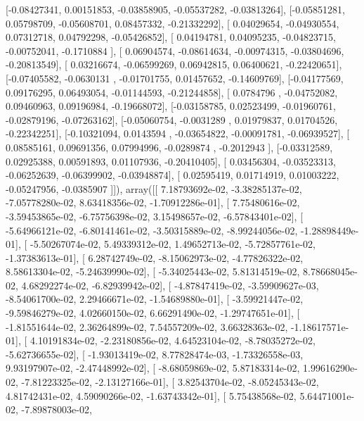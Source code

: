 \documentclass{article}
\begin{document}
       [-0.08427341,  0.00151853, -0.03858905, -0.05537282, -0.03813264],
       [-0.05851281,  0.05798709, -0.05608701,  0.08457332, -0.21332292],
       [ 0.04029654, -0.04930554,  0.07312718,  0.04792298, -0.05426852],
       [ 0.04194781,  0.04095235, -0.04823715, -0.00752041, -0.1710884 ],
       [ 0.06904574, -0.08614634, -0.00974315, -0.03804696, -0.20813549],
       [ 0.03216674, -0.06599269,  0.06942815,  0.06400621, -0.22420651],
       [-0.07405582, -0.0630131 , -0.01701755,  0.01457652, -0.14609769],
       [-0.04177569,  0.09176295,  0.06493054, -0.01144593, -0.21244858],
       [ 0.0784796 , -0.04752082,  0.09460963,  0.09196984, -0.19668072],
       [-0.03158785,  0.02523499, -0.01960761, -0.02879196, -0.07263162],
       [-0.05060754, -0.0031289 ,  0.01979837,  0.01704526, -0.22342251],
       [-0.10321094,  0.0143594 , -0.03654822, -0.00091781, -0.06939527],
       [ 0.08585161,  0.09691356,  0.07994996, -0.0289874 , -0.2012943 ],
       [-0.03312589,  0.02925388,  0.00591893,  0.01107936, -0.20410405],
       [ 0.03456304, -0.03523313, -0.06252639, -0.06399902, -0.03948874],
       [ 0.02595419,  0.01714919,  0.01003222, -0.05247956, -0.0385907 ]]), array([[  7.18793692e-02,  -3.38285137e-02,  -7.05778280e-02,
          8.63418356e-02,  -1.70912286e-01],
       [  7.75480616e-02,  -3.59453865e-02,  -6.75756398e-02,
          3.15498657e-02,  -6.57843401e-02],
       [ -5.64966121e-02,  -6.80141461e-02,  -3.50315889e-02,
         -8.99244056e-02,  -1.28898449e-01],
       [ -5.50267074e-02,   5.49339312e-02,   1.49652713e-02,
         -5.72857761e-02,  -1.37383613e-01],
       [  6.28742749e-02,  -8.15062973e-02,  -4.77826322e-02,
          8.58613304e-02,  -5.24639990e-02],
       [ -5.34025443e-02,   5.81314519e-02,   8.78668045e-02,
          4.68292274e-02,  -6.82939942e-02],
       [ -4.87847419e-02,  -3.59909627e-03,  -8.54061700e-02,
          2.29466671e-02,  -1.54689880e-01],
       [ -3.59921447e-02,  -9.59846279e-02,   4.02660150e-02,
          6.66291490e-02,  -1.29747651e-01],
       [ -1.81551644e-02,   2.36264899e-02,   7.54557209e-02,
          3.66328363e-02,  -1.18617571e-01],
       [  4.10191834e-02,  -2.23180856e-02,   4.64523104e-02,
         -8.78035272e-02,  -5.62736655e-02],
       [ -1.93013419e-02,   8.77828474e-03,  -1.73326558e-03,
          9.93197907e-02,  -2.47448992e-02],
       [ -8.68059869e-02,   5.87183314e-02,   1.99616290e-02,
         -7.81223325e-02,  -2.13127166e-01],
       [  3.82543704e-02,  -8.05245343e-02,   4.81742431e-02,
          4.59090266e-02,  -1.63743342e-01],
       [  5.75438568e-02,   5.64471001e-02,  -7.89878003e-02,
\end{document}
